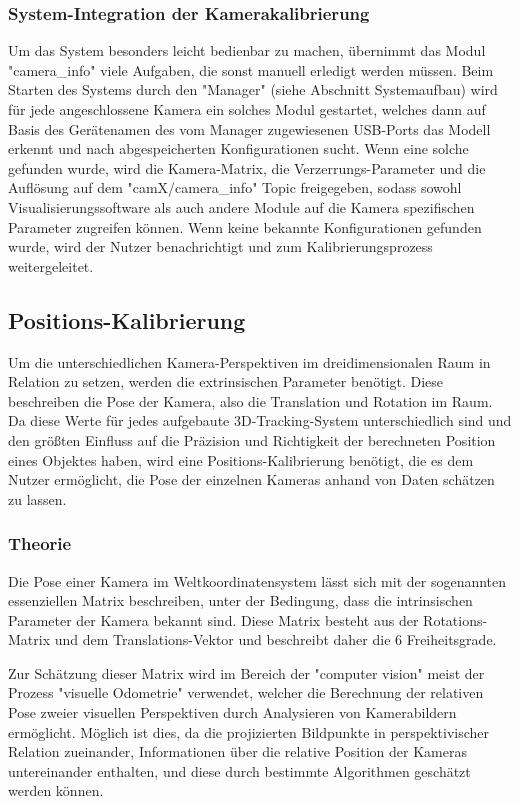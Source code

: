 \documentclass[12pt, ngerman]{article}
\begin{document}
\subsubsection{System-Integration der Kamerakalibrierung}
Um das System besonders leicht bedienbar zu machen, übernimmt das Modul "camera\_info" viele Aufgaben, die sonst manuell erledigt werden müssen. Beim Starten des Systems durch den "Manager" (siehe Abschnitt Systemaufbau) wird für jede angeschlossene Kamera ein solches Modul gestartet, welches dann auf Basis des Gerätenamen des vom Manager zugewiesenen USB-Ports das Modell erkennt und nach abgespeicherten Konfigurationen sucht. Wenn eine solche gefunden wurde, wird die Kamera-Matrix, die Verzerrungs-Parameter und die Auflösung auf dem "camX/camera\_info" Topic freigegeben, sodass sowohl Visualisierungssoftware als auch andere Module auf die Kamera spezifischen Parameter zugreifen können. Wenn keine bekannte Konfigurationen gefunden wurde, wird der Nutzer benachrichtigt und zum Kalibrierungsprozess weitergeleitet.

\subsection{Positions-Kalibrierung}
Um die unterschiedlichen Kamera-Perspektiven im dreidimensionalen Raum in Relation zu setzen, werden die extrinsischen Parameter benötigt. Diese beschreiben die Pose der Kamera, also die Translation und Rotation im Raum. Da diese Werte für jedes aufgebaute 3D-Tracking-System unterschiedlich sind und den größten Einfluss auf die Präzision und Richtigkeit der berechneten Position eines Objektes haben, wird eine Positions-Kalibrierung benötigt, die es dem Nutzer ermöglicht, die Pose der einzelnen Kameras anhand von Daten schätzen zu lassen. 

\subsubsection{Theorie}
Die Pose einer Kamera im Weltkoordinatensystem lässt sich mit der sogenannten essenziellen Matrix beschreiben, unter der Bedingung, dass die intrinsischen Parameter der Kamera bekannt sind. Diese Matrix besteht aus der Rotations-Matrix und dem Translations-Vektor und beschreibt daher die 6 Freiheitsgrade. 

Zur Schätzung dieser Matrix wird im Bereich der "computer vision" meist der Prozess "visuelle Odometrie" verwendet, welcher die Berechnung der relativen Pose zweier visuellen Perspektiven durch Analysieren von Kamerabildern ermöglicht. Möglich ist dies, da die projizierten Bildpunkte in perspektivischer Relation zueinander, Informationen über die relative Position der Kameras untereinander enthalten, und diese durch bestimmte Algorithmen geschätzt werden können.
\end{document}
